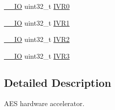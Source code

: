 \begin{DoxyCompactItemize}
\item 
\hyperlink{core__sc300_8h_aec43007d9998a0a0e01faede4133d6be}{\-\_\-\-\_\-\-I\-O} uint32\-\_\-t \hyperlink{struct_a_e_s___type_def_a5a27101392cc89c762fc478232a8cfd9}{I\-V\-R0}
\item 
\hyperlink{core__sc300_8h_aec43007d9998a0a0e01faede4133d6be}{\-\_\-\-\_\-\-I\-O} uint32\-\_\-t \hyperlink{struct_a_e_s___type_def_a6fb98e2e9d464161d805b5785b764ddf}{I\-V\-R1}
\item 
\hyperlink{core__sc300_8h_aec43007d9998a0a0e01faede4133d6be}{\-\_\-\-\_\-\-I\-O} uint32\-\_\-t \hyperlink{struct_a_e_s___type_def_ab7dcb8897ad132d7c2a334eb5059c955}{I\-V\-R2}
\item 
\hyperlink{core__sc300_8h_aec43007d9998a0a0e01faede4133d6be}{\-\_\-\-\_\-\-I\-O} uint32\-\_\-t \hyperlink{struct_a_e_s___type_def_a0f7547617d859202a18a12933e7dce8e}{I\-V\-R3}
\end{DoxyCompactItemize}


\subsection{Detailed Description}
A\-E\-S hardware accelerator. 

